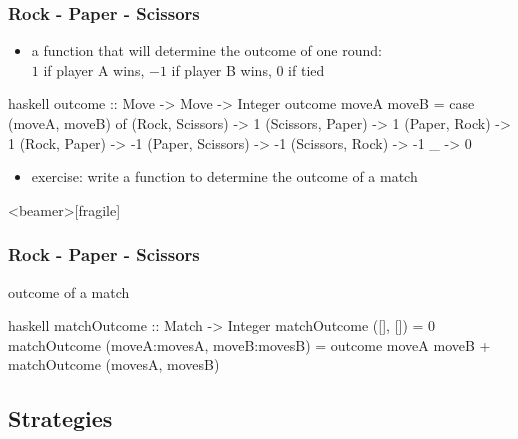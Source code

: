 \documentclass[dvipsnames]{beamer}
\theoremstyle{plain}
\begin{document}
\begin{frame}[fragile]
  \frametitle{Rock - Paper - Scissors}

  \begin{itemize}
    \item a function that will determine the outcome of one round:\\
      $1$ if player A wins, $-1$ if player B wins, $0$ if tied
  \end{itemize}

  \begin{exampleblock}{}
    \begin{pygments}{haskell}
outcome :: Move -> Move -> Integer
outcome moveA moveB =
    case (moveA, moveB) of
      (Rock, Scissors)  -> 1
      (Scissors, Paper) -> 1
      (Paper, Rock)     -> 1
      (Rock, Paper)     -> -1
      (Paper, Scissors) -> -1
      (Scissors, Rock)  -> -1
      _                 -> 0
    \end{pygments}
  \end{exampleblock}

  \pause
  \begin{itemize}
    \item exercise: write a function to determine the outcome of a match
  \end{itemize}
\end{frame}

\begin{frame}<beamer>[fragile]
  \frametitle{Rock - Paper - Scissors}

  \begin{exampleblock}{outcome of a match}
    \begin{pygments}{haskell}
matchOutcome :: Match -> Integer
matchOutcome ([], []) = 0
matchOutcome (moveA:movesA, moveB:movesB) =
    outcome moveA moveB + matchOutcome (movesA, movesB)
    \end{pygments}
  \end{exampleblock}
\end{frame}

\subsection{Strategies}
\end{document}

